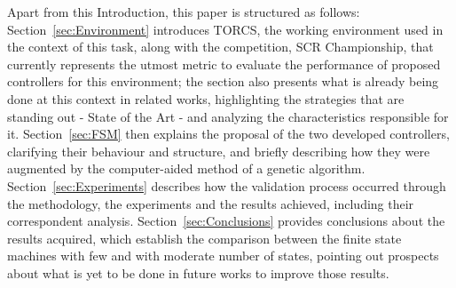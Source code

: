 	Apart from this Introduction, this paper is structured as follows: Section~\ref{sec:Environment} introduces
	TORCS, the working environment used in the context of this task, along with the competition, SCR Championship,
	that currently represents the utmost metric to evaluate the performance of proposed controllers for this
	environment; the section also presents what is already being done at this context in related works, highlighting
	the strategies that are standing out - State of the Art - and analyzing the characteristics responsible for it.
	Section~\ref{sec:FSM} then explains the proposal of the two developed controllers, clarifying their behaviour and
	structure, and briefly describing how they were augmented by the computer-aided method of a genetic algorithm.
	Section~\ref{sec:Experiments} describes how the validation process occurred through the methodology, the
	experiments and the results achieved, including their correspondent analysis. Section~\ref{sec:Conclusions}
	provides conclusions about the results acquired, which establish the comparison between the finite state machines
	with few and with moderate number of states, pointing out prospects about what is yet to be done in future works
	to improve those results.
